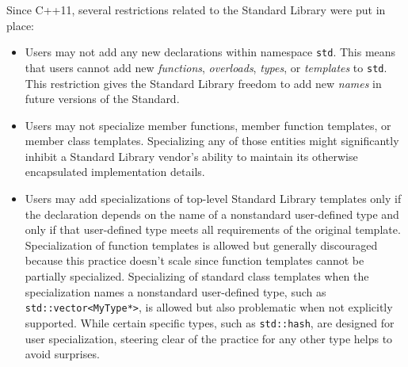 Since C++11, several restrictions related to the Standard Library were
put in place:
\begin{itemize}
\item{Users may not add any new declarations within namespace \lstinline!std!. This means that users cannot add new \emph{functions}, \emph{overloads}, \emph{types}, or \emph{templates} to \lstinline!std!. This restriction gives the Standard Library freedom to add new \emph{names} in future versions of the Standard.}
\item{Users may not specialize member functions, member function templates, or member class templates. Specializing any of those entities might significantly inhibit a Standard Library vendor’s ability to maintain its otherwise encapsulated implementation details.}
\item{Users may add specializations of top-level Standard Library templates only if the declaration depends on the name of a nonstandard user-defined type and only if that user-defined type meets all requirements of the original template. Specialization of function templates is allowed but generally discouraged because this practice doesn’t scale since function templates cannot be partially specialized. Specializing of standard class templates when the specialization names a nonstandard user-defined type, such as \lstinline!std::vector<MyType*>!, is allowed but also problematic when not explicitly supported. While certain specific types, such as \lstinline!std::hash!, are designed for user specialization, steering clear of the practice for any other type helps to avoid surprises.}
\end{itemize}


